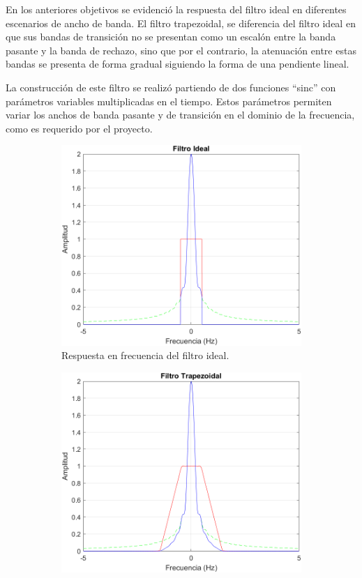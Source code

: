 En los anteriores objetivos se evidenció la respuesta del filtro ideal en diferentes escenarios de ancho de banda. El filtro trapezoidal, se diferencia del filtro ideal en que sus bandas de transición no se presentan como un escalón entre la banda pasante y la banda de rechazo, sino que por el contrario, la atenuación entre estas bandas se presenta de forma gradual siguiendo la forma de una pendiente lineal.

La construcción de este filtro se realizó partiendo de dos funciones ``sinc'' con parámetros variables multiplicadas en el tiempo. Estos parámetros permiten variar los anchos de banda pasante y de transición en el dominio de la frecuencia, como es requerido por el proyecto.

\begin{figure}[H]
	\centering
	\begin{subfigure}[b]{0.48\linewidth}
		\includegraphics[width=\linewidth]{img/FIdeal}
		\caption{\scriptsize Respuesta en frecuencia del filtro ideal.}
		\label{subfig:frecuenciaIdeal}
	\end{subfigure}
	\begin{subfigure}[b]{0.48\linewidth}
		\includegraphics[width=\linewidth]{img/FTrap}

\end{subfigure}
\end{figure}
